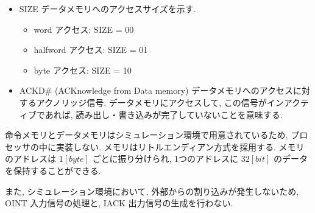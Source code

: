 \documentclass[../specifications.tex]{subfiles}
\begin{document}
\begin{itemize}
    \item SIZE
    \newline データメモリへのアクセスサイズを示す.
    \begin{itemize}
      \item word アクセス: SIZE = 00
      \item halfword アクセス: SIZE = 01
      \item byte アクセス: SIZE = 10
    \end{itemize}

    \item ACKD\# (ACKnowledge from Data memory)
    \newline データメモリへのアクセスに対するアクノリッジ信号.
    データメモリにアクセスして, この信号がインアクティブであれば, 
    読み出し・書き込みが完了していないことを意味する.

  \end{itemize}

  命令メモリとデータメモリはシミュレーション環境で用意されているため, 
  プロセッサの中に実装しない.
  メモリはリトルエンディアン方式を採用する.
  メモリのアドレスは $1[byte]$ ごとに振り分けられ, 
  1つのアドレスに $32[bit]$ のデータを保持することができる.

  また, シミュレーション環境において, 外部からの割り込みが発生しないため, 
  OINT 入力信号の処理と, IACK 出力信号の生成を行わない.
\end{document}
